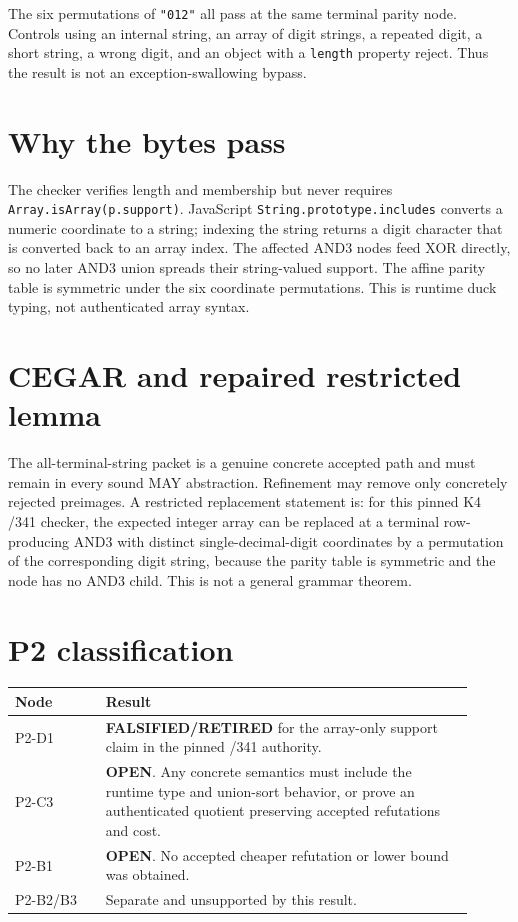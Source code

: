 \documentclass[11pt]{article}
\newcommand{\status}[1]{\textbf{#1}}
\begin{document}
The six permutations of \texttt{"012"} all pass at the same terminal parity node.  Controls using an internal string, an array of digit strings, a repeated digit, a short string, a wrong digit, and an object with a \texttt{length} property reject.  Thus the result is not an exception-swallowing bypass.

\section*{Why the bytes pass}
The checker verifies length and membership but never requires \texttt{Array.isArray(p.support)}.  JavaScript \texttt{String.prototype.includes} converts a numeric coordinate to a string; indexing the string returns a digit character that is converted back to an array index.  The affected AND3 nodes feed XOR directly, so no later AND3 union spreads their string-valued support.  The affine parity table is symmetric under the six coordinate permutations.  This is runtime duck typing, not authenticated array syntax.

\section*{CEGAR and repaired restricted lemma}
The all-terminal-string packet is a genuine concrete accepted path and must remain in every sound MAY abstraction.  Refinement may remove only concretely rejected preimages.  A restricted replacement statement is: for this pinned K4 /341 checker, the expected integer array can be replaced at a terminal row-producing AND3 with distinct single-decimal-digit coordinates by a permutation of the corresponding digit string, because the parity table is symmetric and the node has no AND3 child.  This is not a general grammar theorem.

\section*{P2 classification}
\begin{longtable}{p{0.18\linewidth}p{0.73\linewidth}}
\toprule
Node & Result \\
\midrule
P2-D1 & \status{FALSIFIED/RETIRED} for the array-only support claim in the pinned /341 authority. \\
P2-C3 & \status{OPEN}.  Any concrete semantics must include the runtime type and union-sort behavior, or prove an authenticated quotient preserving accepted refutations and cost. \\
P2-B1 & \status{OPEN}.  No accepted cheaper refutation or lower bound was obtained. \\
P2-B2/B3 & Separate and unsupported by this result. \\
\bottomrule
\end{longtable}
\end{document}
